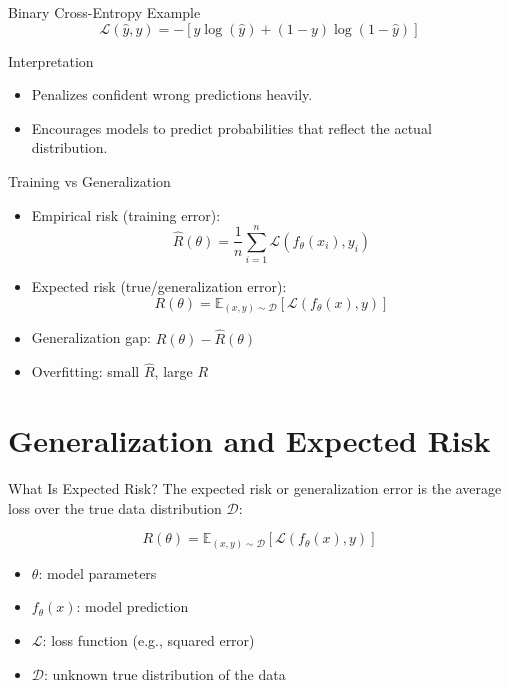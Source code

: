 \documentclass[aspectratio=169]{beamer}
\begin{document}
\begin{frame}[label={sec:org215a98d}]{Binary Cross-Entropy Example}
\begin{equation}
\mathcal{L}(\hat{y}, y) = -[y \log(\hat{y}) + (1 - y) \log(1 - \hat{y})]
\end{equation}
\end{frame}

\begin{frame}[label={sec:org7cea1e5}]{Interpretation}
\begin{itemize}
\item Penalizes confident wrong predictions heavily.
\item Encourages models to predict probabilities that reflect the actual distribution.
\end{itemize}
\end{frame}



\begin{frame}[label={sec:org9517556}]{Training vs Generalization}
\begin{itemize}
\item \alert{Empirical risk} (training error):
\begin{equation}
\hat{R}(\theta) = \frac{1}{n} \sum_{i=1}^n \mathcal{L}(f_\theta(x_i), y_i)
\end{equation}
\item \alert{Expected risk} (true/generalization error):
\begin{equation}
R(\theta) = \mathbb{E}_{(x,y) \sim \mathcal{D}} \left[ \mathcal{L}(f_\theta(x), y) \right]
\end{equation}
\item Generalization gap: \(R(\theta) - \hat{R}(\theta)\)
\item Overfitting: small \(\hat{R}\), large \(R\)
\end{itemize}
\end{frame}


\section{Generalization and Expected Risk}
\label{sec:org59e4aa6}
\begin{frame}[label={sec:org76a9c71}]{What Is Expected Risk?}
The \alert{expected risk} or \alert{generalization error} is the average loss over the true data distribution \(\mathcal{D}\):

\begin{equation}
R(\theta) = \mathbb{E}_{(x,y) \sim \mathcal{D}} \left[ \mathcal{L}(f_\theta(x), y) \right]
\end{equation}

\begin{itemize}
\item \(\theta\): model parameters
\item \(f_\theta(x)\): model prediction
\item \(\mathcal{L}\): loss function (e.g., squared error)
\item \(\mathcal{D}\): unknown true distribution of the data
\end{itemize}
\end{frame}
\end{document}
